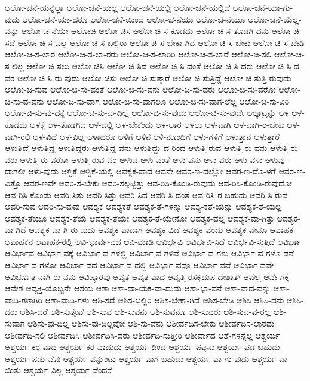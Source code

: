 {ಆಲೋ-ಚನೆ-ಯನ್ನೆಲ್ಲಾ
ಆಲೋ-ಚನೆ-ಯಲ್ಲ
ಆಲೋ-ಚನೆ-ಯಲ್ಲಿ
ಆಲೋ-ಚನೆ-ಯಲ್ಲಿದೆ
ಆಲೋ-ಚನೆ-ಯಾ-ಗು-ವುದು
ಆಲೋ-ಚನೆ-ಯಾ-ದರೂ
ಆಲೋ-ಚನೆ-ಯಿಂದ
ಆಲೋ-ಚ-ನೆಯು
ಆಲೋ-ಚ-ನೆಯೂ
ಆಲೋ-ಚನೆ-ಯೆಲ್ಲ-ವನ್ನು
ಆಲೋ-ಚ-ನೆಯೇ
ಆಲೋಚಿ
ಆಲೋ-ಚಿಸ
ಆಲೋ-ಚಿ-ಸ-ಕೂಡದು
ಆಲೋ-ಚಿ-ಸ-ತೊಡಗಿ-ದನು
ಆಲೋ-ಚಿ-ಸದೆ
ಆಲೋ-ಚಿ-ಸ-ಬಲ್ಲ
ಆಲೋ-ಚಿ-ಸ-ಬಲ್ಲಿರಾ
ಆಲೋ-ಚಿ-ಸ-ಬೇಕಾ-ಗಿದೆ
ಆಲೋ-ಚಿ-ಸ-ಬೇಕು
ಆಲೋ-ಚಿ-ಸ-ಬೇಡಿ
ಆಲೋ-ಚಿ-ಸ-ಲಾರ
ಆಲೋ-ಚಿ-ಸ-ಲಾ-ರರು
ಆಲೋ-ಚಿ-ಸ-ಲಾರಿರಿ
ಆಲೋ-ಚಿ-ಸ-ಲಾರೆ
ಆಲೋ-ಚಿ-ಸಲಿ
ಆಲೋ-ಚಿ-ಸ-ಲಿಲ್ಲ
ಆಲೋ-ಚಿ-ಸಲು
ಆಲೋ-ಚಿಸಿ
ಆಲೋ-ಚಿ-ಸಿದ
ಆಲೋ-ಚಿ-ಸಿ-ದಂತೆ
ಆಲೋ-ಚಿ-ಸಿ-ದರು
ಆಲೋ-ಚಿ-ಸಿ-ದ-ವರ
ಆಲೋ-ಚಿ-ಸಿ-ರು-ವುದು
ಆಲೋ-ಚಿಸು
ಆಲೋ-ಚಿ-ಸುತ್ತಾರೆ
ಆಲೋ-ಚಿ-ಸುತ್ತಿದ್ದೆ
ಆಲೋ-ಚಿ-ಸುತ್ತಿ-ರುವುದು
ಆಲೋ-ಚಿ-ಸುವ
ಆಲೋ-ಚಿ-ಸು-ವಂತೆ
ಆಲೋ-ಚಿ-ಸು-ವನು
ಆಲೋ-ಚಿ-ಸು-ವರು
ಆಲೋ-ಚಿ-ಸು-ವರೋ
ಆಲೋ-ಚಿ-ಸು-ವ-ವನು
ಆಲೋ-ಚಿ-ಸು-ವಾಗ
ಆಲೋ-ಚಿ-ಸು-ವಾಗಲೂ
ಆಲೋ-ಚಿ-ಸು-ವಾಗ-ಲೆಲ್ಲ
ಆಲೋ-ಚಿ-ಸು-ವಿರಿ
ಆಲೋ-ಚಿ-ಸು-ವು-ದಕ್ಕೆ
ಆಲೋ-ಚಿ-ಸು-ವು-ದಿಲ್ಲ
ಆಲೋ-ಚಿ-ಸು-ವುದು
ಆಲೋ-ಚಿ-ಸು-ವುದೇ
ಆಲ್ಕಾಟ್ರನ್ನು
ಆಳ
ಆಳ-ಕೂಡದು
ಆಳಕ್ಕೆ
ಆಳ-ತೊಡಗಿದ
ಆಳ-ದಲ್ಲಿ
ಆಳ-ಬೇಕೆಂದು
ಆಳ-ಲಾರ
ಆಳಲು
ಆಳ-ವಾಗಿ
ಆಳ-ವಾಗಿ-ರ-ಬೇಕು
ಆಳ-ವಾಗಿ-ರಲಿ
ಆಳ-ವಿದೆ
ಆಳ-ವಿಲ್ಲ
ಆಳಾದರೂ
ಆಳಿಗೆ
ಆಳಿನ
ಆಳಿ-ನೊಂದಿಗೆ
ಆಳು-ಗಳಿಗೆ
ಆಳುತ್ತಾನೆ
ಆಳುತ್ತಾರೆ
ಆಳುತ್ತಿದೆ
ಆಳುತ್ತಿದ್ದ
ಆಳುತ್ತಿದ್ದರು
ಆಳುತ್ತಿದ್ದ-ವನು
ಆಳುತ್ತಿದ್ದು-ದ-ರಿಂದ
ಆಳುತ್ತಿ-ರುವ
ಆಳುತ್ತಿ-ರು-ವನು
ಆಳುತ್ತಿ-ರು-ವರು
ಆಳುತ್ತಿ-ರು-ವರೋ
ಆಳುತ್ತಿ-ರುವ-ವರ
ಆಳುವ
ಆಳು-ವಂತೆ
ಆಳು-ವನು
ಆಳು-ವರು
ಆಳು-ವಳು
ಆಳುವು-ದಾಗಲೀ
ಆಳು-ವುದು
ಆಳ್ವಿಕೆ
ಆಳ್ವಿಕೆ-ಯಲ್ಲಿ
ಆವಕ್ಯಕ-ವಾದ
ಆವನೇ
ಆವರ-ಣ-ದಲ್ಲೋ
ಆವರ-ಣ-ದೊ-ಳಗೆ
ಆವರ-ಣ-ವಿತ್ತೊ
ಆವರ-ಣವೇ
ಆವರಿ-ಸ-ಬೇಕು
ಆವರಿ-ಸಲ್ಪಟ್ಟಿತ್ತು
ಆವ-ರಿಸಿ-ಕೊಂಡಿ-ರುವುದು
ಆವ-ರಿಸಿ-ಕೊಂಡಿ-ರುವುದೋ
ಆವ-ರಿಸಿ-ಕೊಂಡು
ಆವರಿ-ಸಿತು
ಆವರಿ-ಸಿತ್ತು
ಆವರಿ-ಸಿದ
ಆವರಿ-ಸಿ-ದಂತೆ
ಆವ-ರಿಸಿ-ರ-ಬಹುದು
ಆವರಿ-ಸಿ-ರುವ
ಆವರಿ-ಸುವ
ಆವರಿ-ಸು-ವುವು
ಆವಶ್ಯಕ
ಆವಶ್ಯಕತೆ
ಆವಶ್ಯಕ-ತೆ-ಗಳನ್ನು
ಆವಶ್ಯ-ಕತೆ-ಯನ್ನು
ಆವಶ್ಯಕ-ತೆ-ಯಲ್ಲ
ಆವಶ್ಯಕ-ತೆಯೂ
ಆವಶ್ಯಕ-ತೆಯೆ
ಆವಶ್ಯಕ-ತೆಯೇ
ಆವಶ್ಯಕ-ತೆ-ಯೇನೋ
ಆವಶ್ಯಕ-ವಲ್ಲ
ಆವಶ್ಯಕ-ವಾ-ಗಿತ್ತು
ಆವಶ್ಯಕ-ವಾ-ಗಿದೆ
ಆವಶ್ಯಕ-ವಾ-ಗಿ-ರು-ವುದು
ಆವಶ್ಯಕ-ವಾದಾಗ
ಆವಶ್ಯಕ-ವಿದೆ
ಆವಶ್ಯಕ-ವೆಂದು
ಆವಶ್ಯಕ-ವೇನೂ
ಆವಾಹಕ
ಆವಾಹಕನ
ಆವಾಹಕ-ರಲ್ಲಿ
ಆವಿ-ಭಾರ್ವ-ವದ
ಆವಿ-ಮಾಡಿ
ಆವಿರ್ಭವಿ
ಆವಿರ್ಭವಿ-ಸಿದೆ
ಆವಿರ್ಭವಿ-ಸುತ್ತಿದೆ
ಆವಿರ್ಭಾ
ಆವಿರ್ಭಾವ
ಆವಿರ್ಭಾ-ವಕ್ಕೆ
ಆವಿರ್ಭಾ-ವ-ಗಳಲ್ಲಿ
ಆವಿರ್ಭಾ-ವ-ಗಳಿವೆ
ಆವಿರ್ಭಾ-ವ-ಗಳು
ಆವಿರ್ಭಾ-ವ-ಗಳೊ-ಡನೆ
ಆವಿರ್ಭಾ-ವ-ಗಳೋ
ಆವಿರ್ಭಾ-ವದ
ಆವಿರ್ಭಾ-ವ-ದಲ್ಲಿ
ಆವಿರ್ಭಾ-ವವೂ
ಆವಿರ್ಭಾ-ವವೆ
ಆವಿರ್ಭಾ-ವವೇ
ಆವಿರ್ಭೂತ-ನಾಗಿ-ರು-ವನು
ಆವಿಷ್ಕಾರವು
ಆವೃತ
ಆವೃತ-ವಾದ
ಆವೃತ್ತಿ-ರಸಕೃದುಪ-ದೇಶಾತ್
ಆವೆಲ್ಲ
ಆವೇ-ಗಕ್ಕೆ
ಆವೇಶ
ಆವ್ಯಕ್ತಿ-ಯೊಬ್ಬನೇ
ಆಶಯ
ಆಶಾ
ಆಶಾ-ದಾ-ಯಕ-ವಾ-ದುದು
ಆಶಾ-ಭಾ-ವನೆ
ಆಶಾ-ವಾದ-ವನ್ನು
ಆಶಾ-ವಾದಿ-ಗಳಾಗಿರಿ
ಆಶಾ-ವಾದಿ-ಗಳು
ಆಶಿ-ಸದೆ
ಆಶಿಸ-ಬಲ್ಲಿರಿ
ಆಶಿಸ-ಬೇಕಾ-ಗಿದೆ
ಆಶಿಸ-ಬೇಡಿ
ಆಶಿಸಿ
ಆಶಿಸಿ-ದನು
ಆಶಿಸಿ-ದರು
ಆಶಿಸಿ-ದರೆ
ಆಶಿ-ಸುತ್ತೇವೆ
ಆಶಿ-ಸುವ
ಆಶಿ-ಸುವನು
ಆಶಿ-ಸುವನೊ
ಆಶಿ-ಸುವರು
ಆಶಿ-ಸುವ-ವ-ರಲ್ಲ
ಆಶಿ-ಸುವಾಗ
ಆಶಿಸು-ವು-ದಿಲ್ಲ
ಆಶಿಸು-ವು-ದಿಲ್ಲವೋ
ಆಶಿ-ಸು-ವೆನು
ಆಶೀರ್ವದಿಸ-ಬೇಕು
ಆಶೀರ್ವದಿಸ-ಲಾರದು
ಆಶೀರ್ವದಿ-ಸಲಿ
ಆಶೀರ್ವದಿಸಿ
ಆಶೀರ್ವದಿಸಿ-ದರು
ಆಶೀರ್ವದಿ-ಸುತ್ತೀರಿ
ಆಶೀರ್ವಾದ
ಆಶೆ-ಗಳನ್ನೆಲ್ಲ
ಆಶ್ಚರ್ಯ
ಆಶ್ಚರ್ಯ-ಕರ-ವಾದ
ಆಶ್ಚರ್ಯ-ಕರ-ವಾದುದು
ಆಶ್ಚರ್ಯ-ದಿಂದ
ಆಶ್ಚರ್ಯ-ಪಟ್ಟನು
ಆಶ್ಚರ್ಯ-ಪಡ-ಬಹುದು
ಆಶ್ಚರ್ಯ-ಪಡು-ವೆವು
ಆಶ್ಚರ್ಯ-ವನ್ನುಂಟು
ಆಶ್ಚರ್ಯ-ವಾಗ-ಬಹುದು
ಆಶ್ಚರ್ಯ-ವಾ-ಗು-ವುದು
ಆಶ್ಚರ್ಯ-ವಾ-ಯಿತು
ಆಶ್ಚರ್ಯ-ವಿಲ್ಲ
ಆಶ್ಚರ್ಯ-ವೆಂದರೆ
}
